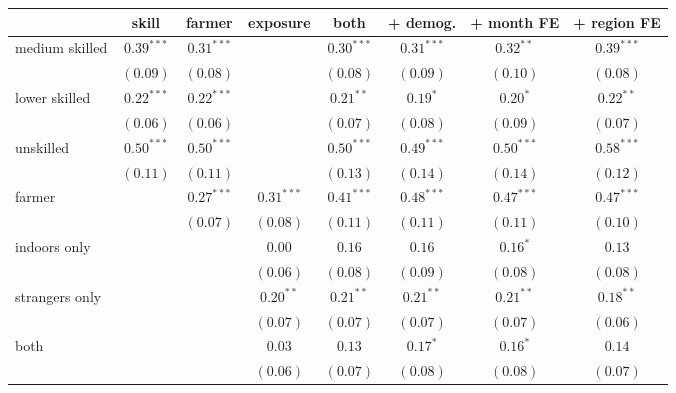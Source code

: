 
\begin{table}
\begin{center}
\begin{tabular}{l c c c c c c c}
\hline
 & skill & farmer & exposure & both & + demog. & + month FE & + region FE \\
\hline
medium skilled & $0.39^{***}$ & $0.31^{***}$ &              & $0.30^{***}$ & $0.31^{***}$  & $0.32^{**}$   & $0.39^{***}$  \\
               & $(0.09)$     & $(0.08)$     &              & $(0.08)$     & $(0.09)$      & $(0.10)$      & $(0.08)$      \\
lower skilled  & $0.22^{***}$ & $0.22^{***}$ &              & $0.21^{**}$  & $0.19^{*}$    & $0.20^{*}$    & $0.22^{**}$   \\
               & $(0.06)$     & $(0.06)$     &              & $(0.07)$     & $(0.08)$      & $(0.09)$      & $(0.07)$      \\
unskilled      & $0.50^{***}$ & $0.50^{***}$ &              & $0.50^{***}$ & $0.49^{***}$  & $0.50^{***}$  & $0.58^{***}$  \\
               & $(0.11)$     & $(0.11)$     &              & $(0.13)$     & $(0.14)$      & $(0.14)$      & $(0.12)$      \\
farmer         &              & $0.27^{***}$ & $0.31^{***}$ & $0.41^{***}$ & $0.48^{***}$  & $0.47^{***}$  & $0.47^{***}$  \\
               &              & $(0.07)$     & $(0.08)$     & $(0.11)$     & $(0.11)$      & $(0.11)$      & $(0.10)$      \\
indoors only   &              &              & $0.00$       & $0.16$       & $0.16$        & $0.16^{*}$    & $0.13$        \\
               &              &              & $(0.06)$     & $(0.08)$     & $(0.09)$      & $(0.08)$      & $(0.08)$      \\
strangers only &              &              & $0.20^{**}$  & $0.21^{**}$  & $0.21^{**}$   & $0.21^{**}$   & $0.18^{**}$   \\
               &              &              & $(0.07)$     & $(0.07)$     & $(0.07)$      & $(0.07)$      & $(0.06)$      \\
both           &              &              & $0.03$       & $0.13$       & $0.17^{*}$    & $0.16^{*}$    & $0.14$        \\
               &              &              & $(0.06)$     & $(0.07)$     & $(0.08)$      & $(0.08)$      & $(0.07)$      \\

\end{tabular}
\end{center}
\end{table}
